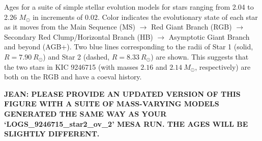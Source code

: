 \label{fig:mesa} Ages for a suite of simple stellar evolution models for stars ranging from 2.04 to 2.26 $M_{\odot}$ in increments of 0.02. Color indicates the evolutionary state of each star as it moves from the Main Sequence (MS) $\rightarrow$ Red Giant Branch (RGB) $\rightarrow$ Secondary Red Clump/Horizontal Branch (HB) $\rightarrow$ Asymptotic Giant Branch and beyond (AGB+). Two blue lines corresponding to the radii of Star 1 (solid, $R = 7.90 \ R_\odot$) and Star 2 (dashed, $R = 8.33 \ R_\odot$) are shown. This suggests that the two stars in KIC 9246715 (with masses $2.16$ and $2.14 \ M_\odot$, respectively) are both on the RGB and have a coeval history.

\textbf{JEAN: PLEASE PROVIDE AN UPDATED VERSION OF THIS FIGURE WITH A SUITE OF MASS-VARYING MODELS GENERATED THE SAME WAY AS YOUR `LOGS_9246715_star2_ov_2' MESA RUN. THE AGES WILL BE SLIGHTLY DIFFERENT.}
  